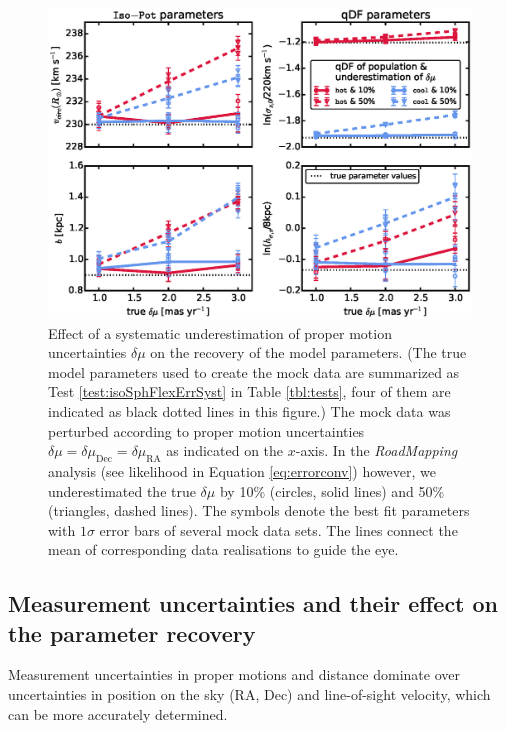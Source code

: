 \documentclass[iop,revtex4,numberedappendix,appendixfloats]{emulateapj}
\newcommand{\RM}{{\sl RoadMapping}}
\begin{document}
\begin{figure}[!htbp]
\centering
\includegraphics[width=\columnwidth]{isoSphFlexErrSyst_offset_vs_error.eps}
\caption{Effect of a systematic underestimation of proper motion uncertainties $\delta \mu$ on the recovery of the model parameters. (The true model parameters used to create the mock data are summarized as Test \ref{test:isoSphFlexErrSyst} in Table \ref{tbl:tests}, four of them are indicated as black dotted lines in this figure.) The mock data was perturbed according to proper motion uncertainties $\delta \mu = \delta \mu_\text{Dec} = \delta \mu_\text{RA}$ as indicated on the $x$-axis. In the \RM{} analysis (see likelihood in Equation \eqref{eq:errorconv}) however, we underestimated the true $\delta \mu$ by 10\% (circles, solid lines) and 50\% (triangles, dashed lines). The symbols denote the best fit parameters with $1\sigma$ error bars of several mock data sets. The lines connect the mean of corresponding data realisations to guide the eye.}
\label{fig:isoSphFlexErrSyst}
\end{figure}

\subsection{Measurement uncertainties and their effect on the parameter recovery} \label{sec:results_errors}

Measurement uncertainties in proper motions and distance dominate over uncertainties in position on the sky (RA, Dec) and line-of-sight velocity, which can be more accurately determined.
\end{document}
